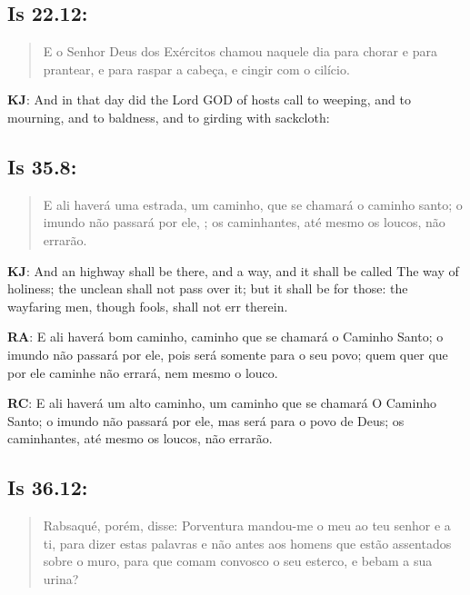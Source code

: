 \subsection*{Is 22.12:} 
 \begin{quote}
  \small
 E o Senhor Deus dos Exércitos\uwave{,} chamou naquele dia para chorar e para prantear, e para raspar a cabeça, e cingir com o cilício.
\end{quote}

\textbf{KJ}: And in that day did the Lord GOD of hosts call to weeping, and to mourning, and to baldness, and to girding with sackcloth:

\subsection*{Is 35.8:} 
 \begin{quote}
  \small
 E ali haverá uma estrada, um caminho, que se chamará o caminho santo; o imundo não passará por ele, ; os caminhantes, até mesmo os loucos, não errarão.
 \end{quote}

\textbf{KJ}: And an highway shall be there, and a way, and it shall be called The way of holiness; the unclean shall not pass over it; but it shall be for those: the wayfaring men, though fools, shall not err therein.

\textbf{RA}: E ali haverá bom caminho, caminho que se chamará o Caminho Santo; o imundo não passará por ele, pois será somente para o seu povo; quem quer que por ele caminhe não errará, nem mesmo o louco.

\textbf{RC}: E ali haverá um alto caminho, um caminho que se chamará O Caminho Santo; o imundo não passará por ele, mas será para o povo de Deus; os caminhantes, até mesmo os loucos, não errarão.

\subsection*{Is 36.12:} 
 \begin{quote}
  \small
 Rabsaqué, porém, disse: Porventura mandou-me o meu  ao teu senhor e a ti, para dizer estas palavras e não antes aos homens que estão assentados sobre o muro, para que comam convosco o seu esterco, e bebam a sua urina?
 \end{quote}
 
